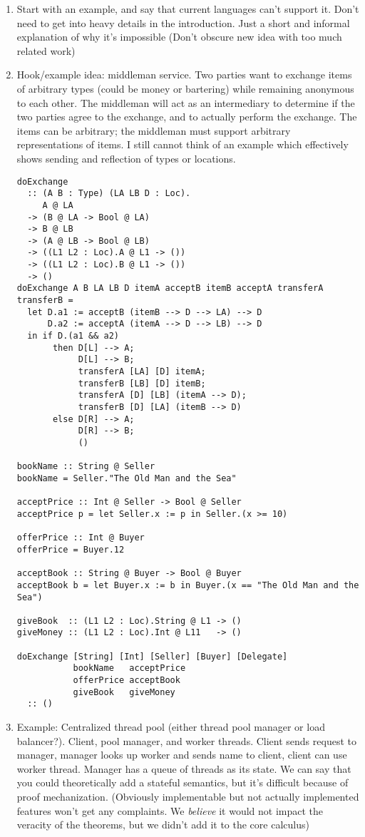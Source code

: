 \documentclass{article}
\theoremstyle{definition}
\begin{document}
\begin{enumerate}
\begin{enumerate}
\begin{enumerate}
			\end{enumerate}
		\item Start with an example, and say that current languages can't support it. Don't need to get into heavy details in the introduction. Just a short and informal explanation of why it's impossible (Don't obscure new idea with too much related work)
		\item Hook/example idea: middleman service. Two parties want to exchange items of arbitrary types (could be money or bartering) while remaining anonymous to each other. The middleman will act as an intermediary to determine if the two parties agree to the exchange, and to actually perform the exchange. The items can be arbitrary; the middleman must support arbitrary representations of items. I still cannot think of an example which effectively shows sending and reflection of types or locations.
\begin{verbatim}
doExchange
  :: (A B : Type) (LA LB D : Loc).
     A @ LA
  -> (B @ LA -> Bool @ LA)
  -> B @ LB
  -> (A @ LB -> Bool @ LB)
  -> ((L1 L2 : Loc).A @ L1 -> ())
  -> ((L1 L2 : Loc).B @ L1 -> ())
  -> ()
doExchange A B LA LB D itemA acceptB itemB acceptA transferA transferB =
  let D.a1 := acceptB (itemB --> D --> LA) --> D
      D.a2 := acceptA (itemA --> D --> LB) --> D
  in if D.(a1 && a2)
       then D[L] --> A;
            D[L] --> B;
            transferA [LA] [D] itemA;
            transferB [LB] [D] itemB;
            transferA [D] [LB] (itemA --> D);
            transferB [D] [LA] (itemB --> D)
       else D[R] --> A;
            D[R] --> B;
            ()
            
bookName :: String @ Seller
bookName = Seller."The Old Man and the Sea"

acceptPrice :: Int @ Seller -> Bool @ Seller
acceptPrice p = let Seller.x := p in Seller.(x >= 10)

offerPrice :: Int @ Buyer
offerPrice = Buyer.12

acceptBook :: String @ Buyer -> Bool @ Buyer
acceptBook b = let Buyer.x := b in Buyer.(x == "The Old Man and the Sea")

giveBook  :: (L1 L2 : Loc).String @ L1 -> ()
giveMoney :: (L1 L2 : Loc).Int @ L11   -> ()

doExchange [String] [Int] [Seller] [Buyer] [Delegate]
           bookName   acceptPrice
           offerPrice acceptBook
           giveBook   giveMoney
  :: ()
\end{verbatim}
	\item Example: Centralized thread pool (either thread pool manager or load balancer?). Client, pool manager, and worker threads. Client sends request to manager, manager looks up worker and sends name to client, client can use worker thread. Manager has a queue of threads as its state. We can say that you could theoretically add a stateful semantics, but it's difficult because of proof mechanization. (Obviously implementable but not actually implemented features won't get any complaints. We \emph{believe} it would not impact the veracity of the theorems, but we didn't add it to the core calculus)
\begin{verbatim}


\end{verbatim}
\end{enumerate}
\end{enumerate}
\end{document}
